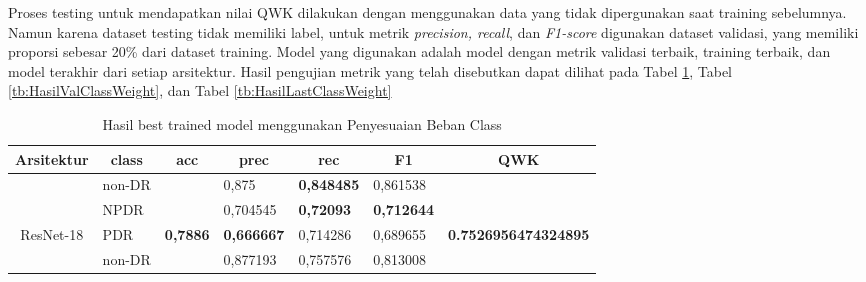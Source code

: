 Proses testing untuk mendapatkan nilai QWK dilakukan dengan menggunakan data yang tidak dipergunakan saat training sebelumnya. Namun karena dataset testing tidak memiliki label, untuk metrik \emph{precision, recall}, dan \emph{F1-score} digunakan dataset validasi, yang memiliki proporsi sebesar 20\% dari dataset training. Model yang digunakan adalah model dengan metrik validasi terbaik, training terbaik, dan model terakhir dari setiap arsitektur.  Hasil pengujian metrik yang telah disebutkan dapat dilihat pada Tabel \ref{tb:HasilTrainClassWeight}, Tabel \ref{tb:HasilValClassWeight}, dan Tabel \ref{tb:HasilLastClassWeight}
\begin{table}[hbtp]
	\begin{center}
		\caption{Hasil best trained model menggunakan Penyesuaian Beban Class}
		\label{tb:HasilTrainClassWeight}
		\begin{tabular}{|c|l|c|l|l|l|c|}
			\hline
			\rowcolor[HTML]{C0C0C0} 
			Arsitektur & \multicolumn{1}{c|}{\cellcolor[HTML]{C0C0C0}class} & acc                      & \multicolumn{1}{c|}{\cellcolor[HTML]{C0C0C0}prec} & \multicolumn{1}{c|}{\cellcolor[HTML]{C0C0C0}rec} & \multicolumn{1}{c|}{\cellcolor[HTML]{C0C0C0}F1} & QWK                                  \\ \hline
			& non-DR                                             &                          & 0,875                                             & \textbf{0,848485}                                & 0,861538                                        &                                      \\ \cline{2-2} \cline{4-6}
			& NPDR                                               &                          & 0,704545                                          & \textbf{0,72093}                                 & \textbf{0,712644}                               &                                      \\ \cline{2-2} \cline{4-6}
			\multirow{-3}{*}{ResNet-18}  & PDR                                                & \multirow{-3}{*}{\textbf{0,7886}} & \textbf{0,666667}                        & 0,714286                                         & 0,689655                                        & \multirow{-3}{*}{\textbf{0.7526956474324895}} \\ \hline
			& non-DR                                             &                          & 0,877193                                          & 0,757576                                         & 0,813008                                        &                                      \\ \cline{2-2} \cline{4-6}

\end{tabular}
\end{center}
\end{table}

